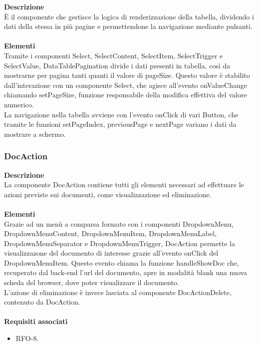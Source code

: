 \textbf{Descrizione}\\
È il componente che gestisce la logica di renderizzazione della tabella, dividendo i dati della stessa in più pagine e permettendone la navigazione mediante pulsanti.\\ \\
\textbf{Elementi}\\
Tramite i componenti Select, SelectContent, SelectItem, SelectTrigger e SelectValue, DataTablePagination divide i dati presenti in tabella, così da mostrarne per pagina tanti quanti il valore di pageSize. Questo valore è stabilito dall'interazione con un componente Select, che agisce all'evento onValueChange chiamando setPageSize, funzione responsabile della modifica effettiva del valore numerico.\\
La navigazione nella tabella avviene con l'evento onClick di vari Button, che tramite le funzioni setPageIndex, previousPage e nextPage variano i dati da mostrare a schermo.

\subsubsection{DocAction}

\textbf{Descrizione}\\
La componente DocAction contiene tutti gli elementi necessari ad effettuare le azioni previste sui documenti, come visualizzazione ed eliminazione.\\ \\
\textbf{Elementi}\\
Grazie ad un menù a comparsa formato con i componenti DropdownMenu, DropdownMenuContent, DropdownMenuItem, DropdownMenuLabel, DropdownMenuSeparator e DropdownMenuTrigger, DocAction permette la visualizzazone del documento di interesse grazie all'evento onClick del DropdownMenuItem. Questo evento chiama la funzione handleShowDoc che, recuperato dal back-end l'url del documento, apre in modalità blank una nuova scheda del browser, dove poter visualizzare il documento.\\
L'azione di eliminazione è invece lasciata al componente DocActionDelete, contenuto da DocAction.\\ \\
\textbf{Requisiti associati}
\begin{itemize}
    \item RFO-8.
\end{itemize}


